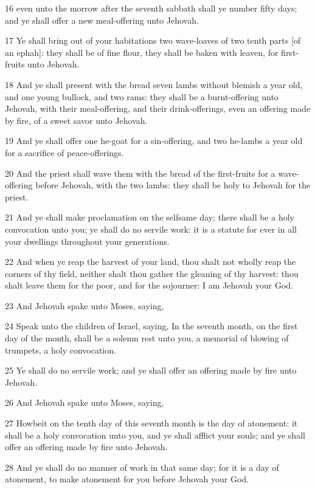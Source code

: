 \par 16 even unto the morrow after the seventh sabbath shall ye number fifty days; and ye shall offer a new meal-offering unto Jehovah.
\par 17 Ye shall bring out of your habitations two wave-loaves of two tenth parts [of an ephah]: they shall be of fine flour, they shall be baken with leaven, for first-fruits unto Jehovah.
\par 18 And ye shall present with the bread seven lambs without blemish a year old, and one young bullock, and two rams: they shall be a burnt-offering unto Jehovah, with their meal-offering, and their drink-offerings, even an offering made by fire, of a sweet savor unto Jehovah.
\par 19 And ye shall offer one he-goat for a sin-offering, and two he-lambs a year old for a sacrifice of peace-offerings.
\par 20 And the priest shall wave them with the bread of the first-fruits for a wave-offering before Jehovah, with the two lambs: they shall be holy to Jehovah for the priest.
\par 21 And ye shall make proclamation on the selfsame day; there shall be a holy convocation unto you; ye shall do no servile work: it is a statute for ever in all your dwellings throughout your generations.
\par 22 And when ye reap the harvest of your land, thou shalt not wholly reap the corners of thy field, neither shalt thou gather the gleaning of thy harvest: thou shalt leave them for the poor, and for the sojourner: I am Jehovah your God.
\par 23 And Jehovah spake unto Moses, saying,
\par 24 Speak unto the children of Israel, saying, In the seventh month, on the first day of the month, shall be a solemn rest unto you, a memorial of blowing of trumpets, a holy convocation.
\par 25 Ye shall do no servile work; and ye shall offer an offering made by fire unto Jehovah.
\par 26 And Jehovah spake unto Moses, saying,
\par 27 Howbeit on the tenth day of this seventh month is the day of atonement: it shall be a holy convocation unto you, and ye shall afflict your souls; and ye shall offer an offering made by fire unto Jehovah.
\par 28 And ye shall do no manner of work in that same day; for it is a day of atonement, to make atonement for you before Jehovah your God.
